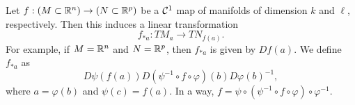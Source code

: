 Let $f : (M \subset \mathbb R^n) \to (N \subset \mathbb R^p)$ be a $\mathcal C^1$ map of manifolds of dimension $k$ and $\ell$, respectively. Then this induces a linear transformation
\[ f_{\ast a}: TM_a \to TN_{f(a)}. \]
For example, if $M = \mathbb R^n$ and $N = \mathbb R^p$, then $f_{\ast a}$ is given by $Df(a)$. We define $f_{\ast a}$ as
\[ D \psi (f(a)) D(\psi^{-1} \circ f \circ \varphi)(b) D \varphi(b)^{-1}, \]
where $a = \varphi(b)$ and $\psi(c) = f(a)$. In a way, $f = \psi \circ (\psi^{-1} \circ f \circ \varphi) \circ \varphi^{-1}$.